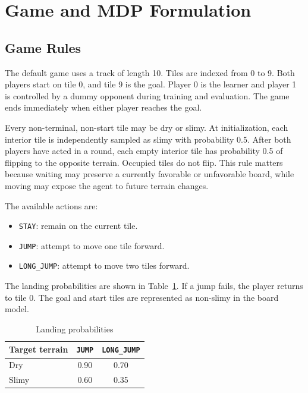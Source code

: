 \documentclass[conference]{IEEEtran}
\begin{document}
\section{Game and MDP Formulation}

\subsection{Game Rules}

The default game uses a track of length 10. Tiles are indexed from 0 to 9. Both
players start on tile 0, and tile 9 is the goal. Player 0 is the learner and player
1 is controlled by a dummy opponent during training and evaluation. The game ends
immediately when either player reaches the goal.

Every non-terminal, non-start tile may be dry or slimy. At initialization, each
interior tile is independently sampled as slimy with probability 0.5. After both
players have acted in a round, each empty interior tile has probability 0.5 of
flipping to the opposite terrain. Occupied tiles do not flip. This rule matters
because waiting may preserve a currently favorable or unfavorable board, while
moving may expose the agent to future terrain changes.

The available actions are:

\begin{itemize}
\item \texttt{STAY}: remain on the current tile.
\item \texttt{JUMP}: attempt to move one tile forward.
\item \texttt{LONG\_JUMP}: attempt to move two tiles forward.
\end{itemize}

The landing probabilities are shown in Table~\ref{tab:landing}. If a jump fails,
the player returns to tile 0. The goal and start tiles are represented as non-slimy
in the board model.

\begin{table}[h]
\centering
\caption{Landing probabilities}
\label{tab:landing}
\begin{tabular}{lcc}
\toprule
Target terrain & \texttt{JUMP} & \texttt{LONG\_JUMP} \\
\midrule
Dry & 0.90 & 0.70 \\
Slimy & 0.60 & 0.35 \\
\bottomrule
\end{tabular}
\end{table}
\end{document}
